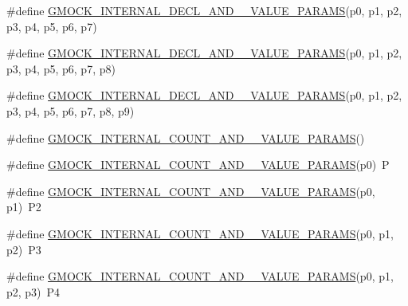 \begin{DoxyCompactItemize}
\#define \mbox{\hyperlink{_obj__test_2lib_2googletest-master_2googlemock_2include_2gmock_2gmock-generated-actions_8h_a3ce778c4907edf2818c948a78a94760a}{G\+M\+O\+C\+K\+\_\+\+I\+N\+T\+E\+R\+N\+A\+L\+\_\+\+D\+E\+C\+L\+\_\+\+A\+N\+D\+\_\+\_\+\+V\+A\+L\+U\+E\+\_\+\+P\+A\+R\+A\+MS}}(p0,  p1,  p2,  p3,  p4,  p5,  p6,  p7)
\item 
\#define \mbox{\hyperlink{_obj__test_2lib_2googletest-master_2googlemock_2include_2gmock_2gmock-generated-actions_8h_a94ebf056f6c78d158bf16eec04583dd0}{G\+M\+O\+C\+K\+\_\+\+I\+N\+T\+E\+R\+N\+A\+L\+\_\+\+D\+E\+C\+L\+\_\+\+A\+N\+D\+\_\+\_\+\+V\+A\+L\+U\+E\+\_\+\+P\+A\+R\+A\+MS}}(p0,  p1,  p2,  p3,  p4,  p5,  p6,  p7,  p8)
\item 
\#define \mbox{\hyperlink{_obj__test_2lib_2googletest-master_2googlemock_2include_2gmock_2gmock-generated-actions_8h_a125c9b0d293f0e900ff37ce42b8ed217}{G\+M\+O\+C\+K\+\_\+\+I\+N\+T\+E\+R\+N\+A\+L\+\_\+\+D\+E\+C\+L\+\_\+\+A\+N\+D\+\_\+\_\+\+V\+A\+L\+U\+E\+\_\+\+P\+A\+R\+A\+MS}}(p0,  p1,  p2,  p3,  p4,  p5,  p6,  p7,  p8,  p9)
\item 
\#define \mbox{\hyperlink{_obj__test_2lib_2googletest-master_2googlemock_2include_2gmock_2gmock-generated-actions_8h_a4876365f0389f3cd8021f650d095be55}{G\+M\+O\+C\+K\+\_\+\+I\+N\+T\+E\+R\+N\+A\+L\+\_\+\+C\+O\+U\+N\+T\+\_\+\+A\+N\+D\+\_\+\_\+\+V\+A\+L\+U\+E\+\_\+\+P\+A\+R\+A\+MS}}()
\item 
\#define \mbox{\hyperlink{_obj__test_2lib_2googletest-master_2googlemock_2include_2gmock_2gmock-generated-actions_8h_a372a4dbbfeba17c2af89aa1027cb7f67}{G\+M\+O\+C\+K\+\_\+\+I\+N\+T\+E\+R\+N\+A\+L\+\_\+\+C\+O\+U\+N\+T\+\_\+\+A\+N\+D\+\_\+\_\+\+V\+A\+L\+U\+E\+\_\+\+P\+A\+R\+A\+MS}}(p0)~P
\item 
\#define \mbox{\hyperlink{_obj__test_2lib_2googletest-master_2googlemock_2include_2gmock_2gmock-generated-actions_8h_a58ef57d40fec061e17fdcbf020b77e20}{G\+M\+O\+C\+K\+\_\+\+I\+N\+T\+E\+R\+N\+A\+L\+\_\+\+C\+O\+U\+N\+T\+\_\+\+A\+N\+D\+\_\+\_\+\+V\+A\+L\+U\+E\+\_\+\+P\+A\+R\+A\+MS}}(p0,  p1)~P2
\item 
\#define \mbox{\hyperlink{_obj__test_2lib_2googletest-master_2googlemock_2include_2gmock_2gmock-generated-actions_8h_a43c845e4e60b3e17c4e312bbc5a8bb66}{G\+M\+O\+C\+K\+\_\+\+I\+N\+T\+E\+R\+N\+A\+L\+\_\+\+C\+O\+U\+N\+T\+\_\+\+A\+N\+D\+\_\+\_\+\+V\+A\+L\+U\+E\+\_\+\+P\+A\+R\+A\+MS}}(p0,  p1,  p2)~P3
\item 
\#define \mbox{\hyperlink{_obj__test_2lib_2googletest-master_2googlemock_2include_2gmock_2gmock-generated-actions_8h_aeb588496af9fc2b8e3c4702dac7e966e}{G\+M\+O\+C\+K\+\_\+\+I\+N\+T\+E\+R\+N\+A\+L\+\_\+\+C\+O\+U\+N\+T\+\_\+\+A\+N\+D\+\_\+\_\+\+V\+A\+L\+U\+E\+\_\+\+P\+A\+R\+A\+MS}}(p0,  p1,  p2,  p3)~P4

\end{DoxyCompactItemize}
